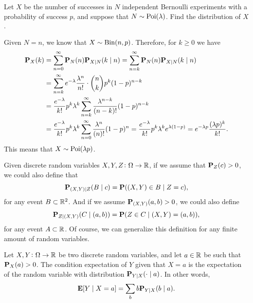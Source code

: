 \documentclass[11pt,a4paper]{article}
\begin{document}
\begin{exercise}
  \label{ex:conditional-distribution}
  Let $X$ be the number of successes in $N$ independent Bernoulli experiments
  with a probability of success $p$,
  and suppose that $N \sim \operatorname{Poi}(\lambda)$.
  Find the distribution of $X$.
\end{exercise}
\begin{solution}
  Given $N = n$, we know that $X \sim \operatorname{Bin}(n,p)$.
  Therefore, for $k \geq 0$ we have
  \begin{align*}
    \mathbf{P}_X(k) &= \sum_{n=0}^{\infty} \mathbf{P}_N(n) \mathbf{P}_{X \mid N}(k \mid n) =
    \sum_{n=k}^{\infty} \mathbf{P}_N(n) \mathbf{P}_{X \mid N}(k \mid n) \\
    &= \sum_{n=k}^{\infty} e^{-\lambda} \frac{\lambda^n}{n!} \cdot
      \binom{n}{k} p^k (1-p)^{n-k} \\
    &= \frac{e^{-\lambda}}{k!} p^k \lambda^k 
      \sum_{n=k}^{\infty} \frac{\lambda^{n-k}}{(n-k)!}(1-p)^{n-k} \\
    &= \frac{e^{-\lambda}}{k!} p^k \lambda^k 
      \sum_{n=0}^{\infty} \frac{\lambda^{n}}{(n)!}(1-p)^{n}
    = \frac{e^{-\lambda}}{k!} p^k \lambda^k e^{\lambda(1-p)}
    = e^{-\lambda p} \frac{(\lambda p)^{k}}{k!}.
  \end{align*}
  This means that $X \sim \operatorname{Poi}(\lambda p)$.
\end{solution}

\begin{remark}
  Given discrete random variables $X,Y,Z \colon \Omega \to \mathbb{R}$,
  if we assume that $\mathbf{P}_Z(c) > 0$,
  we could also define that
  \[
    \mathbf{P}_{(X,Y) \mid Z}(B \mid c) =
    \mathbf{P}((X,Y) \in B \mid Z = c),
  \]
  for any event $B \subset \mathbb{R}^2$.
  And if we assume $\mathbf{P}_{(X,Y)}(a,b) > 0$,
  we could also define
  \[
    \mathbf{P}_{Z \mid (X,Y)}(C \mid (a,b)) =
    \mathbf{P}(Z \in C \mid (X,Y) = (a,b)),
  \]
  for any event $A \subset \mathbb{R}$.
  Of course, we can generalize this definition for any finite amount
  of random variables.
\end{remark}

\begin{definition}
  Let $X,Y \colon \Omega \to \mathbb{R}$ be two discrete random variables,
  and let $a \in \mathbb{R}$ be such that $\mathbf{P}_X(a) > 0$.
  The condition expectation of $Y$ given that $X = a$ is
  the expectation of the random variable with
  distribution $\mathbf{P}_{Y \mid X}(\cdot \mid a)$.
  In other words,
  \[
    \mathbf{E}[Y \mid X = a] = \sum_{b} b \mathbf{P}_{Y \mid X}(b \mid a).
  \]
\end{definition}
\end{document}
